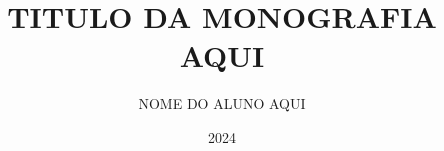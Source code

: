 \documentclass[pt, bsc, classic, a4paper]{ufbathesis}
\title{TITULO DA MONOGRAFIA AQUI}
\date{2024}
\author{NOME DO ALUNO AQUI}
\begin{document}
\pgcompfrontpage

\frontmatter

\pgcomppresentationpage
















 

 

\listoffigures

\listoftables

\lstlistoflistings


\tableofcontents

\mainmatter

% 
% 
% 
%


\end{document}
